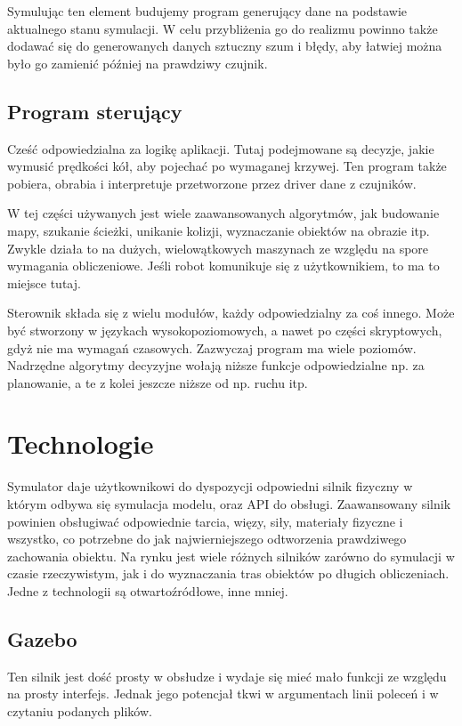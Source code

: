  Symulując ten element budujemy program generujący dane na podstawie aktualnego stanu symulacji. 
 W celu przybliżenia go do realizmu powinno także dodawać się do generowanych danych sztuczny szum i błędy, aby łatwiej można było go zamienić później na prawdziwy czujnik.
 
\subsection{Program sterujący}
 Cześć odpowiedzialna za logikę aplikacji. Tutaj podejmowane są decyzje, jakie wymusić prędkości kół, aby pojechać po wymaganej krzywej.
 Ten program także pobiera, obrabia i interpretuje przetworzone przez driver dane z czujników.
 
 W tej części używanych jest wiele zaawansowanych algorytmów, jak budowanie mapy, szukanie ścieżki, unikanie kolizji, wyznaczanie obiektów na obrazie itp.
 Zwykle działa to na dużych, wielowątkowych maszynach ze względu na spore wymagania obliczeniowe.
 Jeśli robot komunikuje się z użytkownikiem, to ma to miejsce tutaj.
 
 Sterownik składa się z wielu modułów, każdy odpowiedzialny za coś innego. Może być stworzony w językach wysokopoziomowych, a nawet po części skryptowych, gdyż nie ma wymagań czasowych.
 Zazwyczaj program ma wiele poziomów. Nadrzędne algorytmy decyzyjne wołają niższe funkcje odpowiedzialne np. za planowanie, a te z kolei jeszcze niższe od np. ruchu itp.

\section{Technologie}
Symulator daje użytkownikowi do dyspozycji odpowiedni silnik fizyczny w którym odbywa się symulacja modelu, oraz API do obsługi.
Zaawansowany silnik powinien obsługiwać odpowiednie tarcia, więzy, siły, materiały fizyczne i wszystko, co potrzebne do jak najwierniejszego odtworzenia prawdziwego zachowania obiektu.
Na rynku jest wiele różnych silników zarówno do symulacji w czasie rzeczywistym, jak i do wyznaczania tras obiektów po długich obliczeniach.
Jedne z technologii są otwartoźródłowe, inne mniej.

\subsection{Gazebo}
Ten silnik jest dość prosty w obsłudze i wydaje się mieć mało funkcji ze względu na prosty interfejs.
Jednak jego potencjał tkwi w argumentach linii poleceń i w czytaniu podanych plików.

